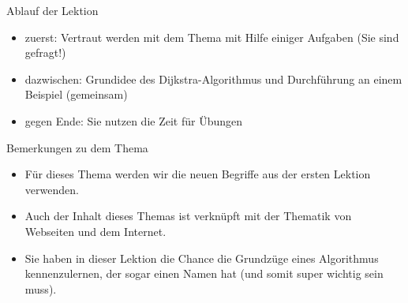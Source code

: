 \begin{frame}[fragile]{Ablauf der Lektion}
\begin{itemize}[<+->]
    \item zuerst: Vertraut werden mit dem Thema mit Hilfe einiger Aufgaben (Sie sind gefragt!)
    \item dazwischen: Grundidee des Dijkstra-Algorithmus und Durchführung an einem Beispiel (gemeinsam)
    \item gegen Ende: Sie nutzen die Zeit für Übungen
\end{itemize}
\end{frame}


\begin{frame}[fragile]{Bemerkungen zu dem Thema} %
\begin{itemize}[<+->]
    \item Für dieses Thema werden wir die neuen Begriffe aus der ersten Lektion verwenden.
    \item Auch der Inhalt dieses Themas ist verknüpft mit der Thematik von Webseiten und dem Internet.
    \item Sie haben in dieser Lektion die Chance die Grundzüge eines Algorithmus kennenzulernen, der sogar einen Namen hat (und somit super wichtig sein muss).
\end{itemize}
\end{frame}


